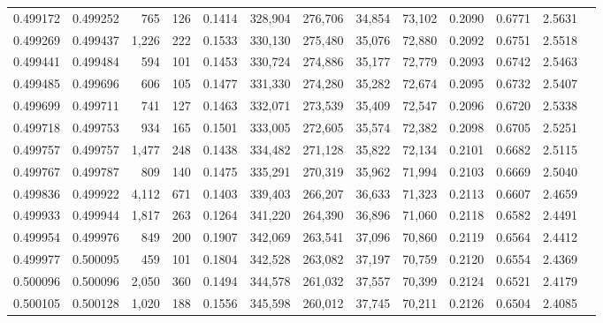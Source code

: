 \begin{tabular}{rrrrrrrrrrrrr}
0.499172 & 0.499252 &   765 &   126 &                                     0.1414 & 328,904 & 276,706 &  34,854 &  73,102 & 0.2090 & 0.6771 & 2.5631 \\
0.499269 & 0.499437 & 1,226 &   222 &                                     0.1533 & 330,130 & 275,480 &  35,076 &  72,880 & 0.2092 & 0.6751 & 2.5518 \\
0.499441 & 0.499484 &   594 &   101 &                                     0.1453 & 330,724 & 274,886 &  35,177 &  72,779 & 0.2093 & 0.6742 & 2.5463 \\
0.499485 & 0.499696 &   606 &   105 &                                     0.1477 & 331,330 & 274,280 &  35,282 &  72,674 & 0.2095 & 0.6732 & 2.5407 \\
0.499699 & 0.499711 &   741 &   127 &                                     0.1463 & 332,071 & 273,539 &  35,409 &  72,547 & 0.2096 & 0.6720 & 2.5338 \\
0.499718 & 0.499753 &   934 &   165 &                                     0.1501 & 333,005 & 272,605 &  35,574 &  72,382 & 0.2098 & 0.6705 & 2.5251 \\
0.499757 & 0.499757 & 1,477 &   248 &                                     0.1438 & 334,482 & 271,128 &  35,822 &  72,134 & 0.2101 & 0.6682 & 2.5115 \\
0.499767 & 0.499787 &   809 &   140 &                                     0.1475 & 335,291 & 270,319 &  35,962 &  71,994 & 0.2103 & 0.6669 & 2.5040 \\
0.499836 & 0.499922 & 4,112 &   671 &                                     0.1403 & 339,403 & 266,207 &  36,633 &  71,323 & 0.2113 & 0.6607 & 2.4659 \\
0.499933 & 0.499944 & 1,817 &   263 &                                     0.1264 & 341,220 & 264,390 &  36,896 &  71,060 & 0.2118 & 0.6582 & 2.4491 \\
0.499954 & 0.499976 &   849 &   200 &                                     0.1907 & 342,069 & 263,541 &  37,096 &  70,860 & 0.2119 & 0.6564 & 2.4412 \\
0.499977 & 0.500095 &   459 &   101 &                                     0.1804 & 342,528 & 263,082 &  37,197 &  70,759 & 0.2120 & 0.6554 & 2.4369 \\
0.500096 & 0.500096 & 2,050 &   360 &                                     0.1494 & 344,578 & 261,032 &  37,557 &  70,399 & 0.2124 & 0.6521 & 2.4179 \\
0.500105 & 0.500128 & 1,020 &   188 &                                     0.1556 & 345,598 & 260,012 &  37,745 &  70,211 & 0.2126 & 0.6504 & 2.4085 \\

\end{tabular}
